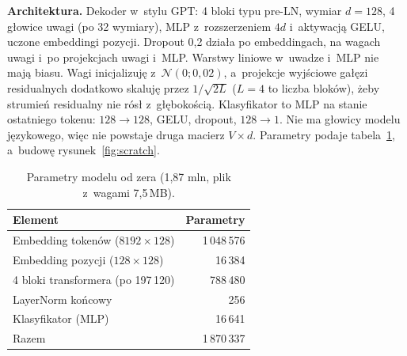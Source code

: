 \documentclass[10pt,a4paper]{article}
\begin{document}
\textbf{Architektura.} Dekoder w~stylu GPT: 4 bloki typu pre-LN, wymiar $d=128$, 4 głowice uwagi (po 32 wymiary), MLP z~rozszerzeniem $4d$ i~aktywacją GELU, uczone embeddingi pozycji. Dropout 0,2 działa po embeddingach, na wagach uwagi i~po projekcjach uwagi i~MLP. Warstwy liniowe w~uwadze i~MLP nie mają biasu. Wagi inicjalizuję z~$\mathcal{N}(0; 0{,}02)$, a~projekcje wyjściowe gałęzi residualnych dodatkowo skaluję przez $1/\sqrt{2L}$ ($L=4$ to liczba bloków), żeby strumień residualny nie rósł z~głębokością. Klasyfikator to MLP na stanie ostatniego tokenu: $128 \to 128$, GELU, dropout, $128 \to 1$. Nie ma głowicy modelu językowego, więc nie powstaje druga macierz $V \times d$. Parametry podaje tabela~\ref{tab:params}, a~budowę rysunek~\ref{fig:scratch}.

\begin{table}[htbp]
\centering
\begin{tabular}{lr}
\toprule
Element & Parametry \\
\midrule
Embedding tokenów ($8192 \times 128$) & 1\,048\,576 \\
Embedding pozycji ($128 \times 128$)  & 16\,384 \\
4 bloki transformera (po 197\,120)    & 788\,480 \\
LayerNorm końcowy                     & 256 \\
Klasyfikator (MLP)                    & 16\,641 \\
\midrule
Razem                                 & 1\,870\,337 \\
\bottomrule
\end{tabular}
\caption{Parametry modelu od zera (1,87 mln, plik z~wagami 7,5\,MB).}
\label{tab:params}
\end{table}
\end{document}
